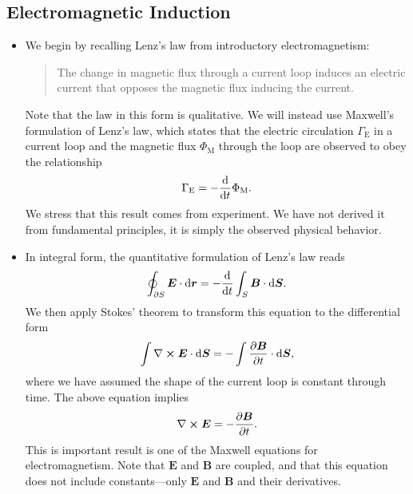 \documentclass[11pt, a4paper]{article}
\newcommand{\diff}{\mathop{}\!\mathrm{d}} %
\renewcommand{\vec}[1]{\bm{#1}} %
\renewcommand{\r}{\vec{r}}
\newcommand{\E}{\vec{E}} %
\newcommand{\B}{\vec{B}} %
\renewcommand{\curl}{\nabla \cross}
\begin{document}
\subsection{Electromagnetic Induction}
\begin{itemize}
	\item We begin by recalling Lenz's law from introductory electromagnetism:
    \begin{quote}
        The change in magnetic flux through a current loop induces an electric current that opposes the magnetic flux inducing the current. 
    \end{quote}
	Note that the law in this form is qualitative. We will instead use Maxwell's formulation of Lenz's law, which states that the electric circulation $ \Gamma_{\mathrm{E}} $ in a current loop and the magnetic flux $ \Phi_{\mathrm{M}} $ through the loop are observed to obey the relationship
	\begin{equation*}
		\Gamma_{\mathrm{E}} = -\dv{t} \Phi_{\mathrm{M}}.
	\end{equation*}
    We stress that this result comes from experiment. We have not derived it from fundamental principles, it is simply the observed physical behavior.
	
	\item In integral form, the quantitative formulation of Lenz's law reads
	\begin{equation*}
		\oint_{\partial S}\E \cdot \diff \r = - \dv{t} \int_{S} \B \cdot \diff \vec{S}.
	\end{equation*}
	We then apply Stokes' theorem to transform this equation to the differential form
	\begin{equation*}
		\int \curl \E \cdot \diff \vec{S} = - \int \pdv{\B}{t} \cdot \diff \vec{S},
	\end{equation*}
    where we have assumed the shape of the current loop is constant through time. The above equation implies
	\begin{equation*}
		\curl \E = - \pdv{\B}{t}.
	\end{equation*}
	This is important result is one of the Maxwell equations for electromagnetism. Note that $ \E $ and $ \B $ are coupled, and that this equation does not include constants---only $ \E $ and $ \B $ and their derivatives. 
	
\end{itemize}
\end{document}
